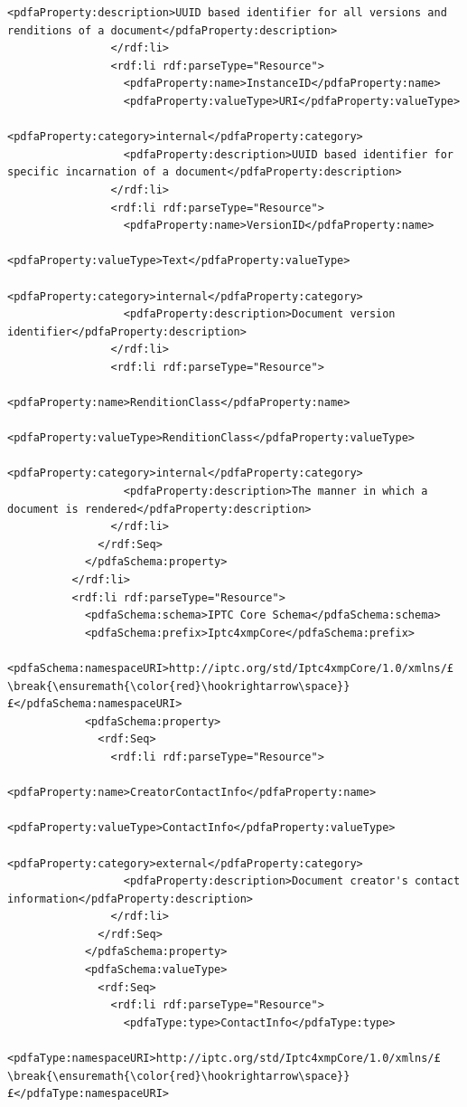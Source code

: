 \begin{lstlisting}[style=myXML,
caption={Second part of the XML metadata embedded in a PDF file (some reformatting has been done to fit the text in the boarders)}, label={lst:pdfinfoOutputPart2}]
                  <pdfaProperty:description>UUID based identifier for all versions and renditions of a document</pdfaProperty:description>
                </rdf:li>
                <rdf:li rdf:parseType="Resource">
                  <pdfaProperty:name>InstanceID</pdfaProperty:name>
                  <pdfaProperty:valueType>URI</pdfaProperty:valueType>
                  <pdfaProperty:category>internal</pdfaProperty:category>
                  <pdfaProperty:description>UUID based identifier for specific incarnation of a document</pdfaProperty:description>
                </rdf:li>
                <rdf:li rdf:parseType="Resource">
                  <pdfaProperty:name>VersionID</pdfaProperty:name>
                  <pdfaProperty:valueType>Text</pdfaProperty:valueType>
                  <pdfaProperty:category>internal</pdfaProperty:category>
                  <pdfaProperty:description>Document version identifier</pdfaProperty:description>
                </rdf:li>
                <rdf:li rdf:parseType="Resource">
                  <pdfaProperty:name>RenditionClass</pdfaProperty:name>
                  <pdfaProperty:valueType>RenditionClass</pdfaProperty:valueType>
                  <pdfaProperty:category>internal</pdfaProperty:category>
                  <pdfaProperty:description>The manner in which a document is rendered</pdfaProperty:description>
                </rdf:li>
              </rdf:Seq>
            </pdfaSchema:property>
          </rdf:li>
          <rdf:li rdf:parseType="Resource">
            <pdfaSchema:schema>IPTC Core Schema</pdfaSchema:schema>
            <pdfaSchema:prefix>Iptc4xmpCore</pdfaSchema:prefix>
            <pdfaSchema:namespaceURI>http://iptc.org/std/Iptc4xmpCore/1.0/xmlns/£\break{\ensuremath{\color{red}\hookrightarrow\space}}£</pdfaSchema:namespaceURI>
            <pdfaSchema:property>
              <rdf:Seq>
                <rdf:li rdf:parseType="Resource">
                  <pdfaProperty:name>CreatorContactInfo</pdfaProperty:name>
                  <pdfaProperty:valueType>ContactInfo</pdfaProperty:valueType>
                  <pdfaProperty:category>external</pdfaProperty:category>
                  <pdfaProperty:description>Document creator's contact information</pdfaProperty:description>
                </rdf:li>
              </rdf:Seq>
            </pdfaSchema:property>
            <pdfaSchema:valueType>
              <rdf:Seq>
                <rdf:li rdf:parseType="Resource">
                  <pdfaType:type>ContactInfo</pdfaType:type>
                  <pdfaType:namespaceURI>http://iptc.org/std/Iptc4xmpCore/1.0/xmlns/£\break{\ensuremath{\color{red}\hookrightarrow\space}}£</pdfaType:namespaceURI>

\end{lstlisting}
